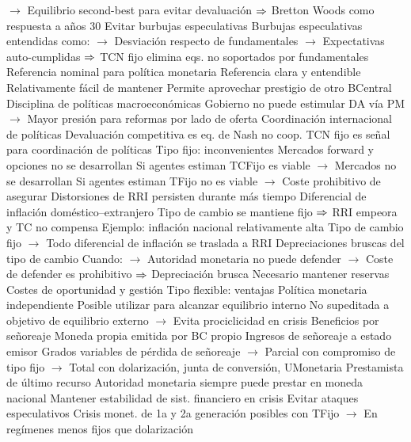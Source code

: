 \documentclass{nuevotema}
\begin{document}
\begin{esquemal}
				\4[] $\to$ Equilibrio second-best para evitar devaluación
				\4[] $\Rightarrow$ Bretton Woods como respuesta a años 30
				\4 Evitar burbujas especulativas
				\4[] Burbujas especulativas entendidas como:
				\4[] $\to$ Desviación respecto de fundamentales
				\4[] $\to$ Expectativas auto-cumplidas
				\4[] $\Rightarrow$ TCN fijo elimina eqs. no soportados por fundamentales
				\4 Referencia nominal para política monetaria
				\4[] Referencia clara y entendible
				\4[] Relativamente fácil de mantener
				\4[] Permite aprovechar prestigio de otro BCentral
				\4 Disciplina de políticas macroeconómicas
				\4[] Gobierno no puede estimular DA vía PM
				\4[] $\to$ Mayor presión para reformas por lado de oferta
				\4 Coordinación internacional de políticas
				\4[] Devaluación competitiva es eq. de Nash no coop.
				\4[] TCN fijo es señal para coordinación de políticas
			\3 Tipo fijo: inconvenientes
				\4 Mercados forward y opciones no se desarrollan
				\4[] Si agentes estiman TCFijo es viable
				\4[] $\to$ Mercados no se desarrollan
				\4[] Si agentes estiman TFijo no es viable
				\4[] $\to$ Coste prohibitivo de asegurar
				\4 Distorsiones de RRI persisten durante más tiempo
				\4[] Diferencial de inflación doméstico--extranjero
				\4[] Tipo de cambio se mantiene fijo
				\4[] $\Rightarrow$ RRI empeora y TC no compensa
				\4[] Ejemplo: inflación nacional relativamente alta
				\4[] Tipo de cambio fijo
				\4[] $\to$ Todo diferencial de inflación se traslada a RRI
				\4 Depreciaciones bruscas del tipo de cambio 
				\4[] Cuando:
				\4[] $\to$ Autoridad monetaria no puede defender
				\4[] $\to$ Coste de defender es prohibitivo
				\4[] $\Rightarrow$ Depreciación brusca
				\4 Necesario mantener reservas
				\4[] Costes de oportunidad y gestión
			\3 Tipo flexible: ventajas
				\4 Política monetaria independiente
				\4[] Posible utilizar para alcanzar equilibrio interno
				\4[] No supeditada a objetivo de equilibrio externo
				\4[] $\to$ Evita prociclicidad en crisis
				\4 Beneficios por señoreaje
				\4[] Moneda propia emitida por BC propio
				\4[] Ingresos de señoreaje a estado emisor
				\4[] Grados variables de pérdida de señoreaje
				\4[] $\to$ Parcial con compromiso de tipo fijo
				\4[] $\to$ Total con dolarización, junta de conversión, UMonetaria
				\4 Prestamista de último recurso
				\4[] Autoridad monetaria siempre puede prestar en moneda nacional
				\4[] Mantener estabilidad de sist. financiero en crisis
				\4 Evitar ataques especulativos
				\4[] Crisis monet. de 1a y 2a generación posibles con TFijo
				\4[] $\to$ En regímenes menos fijos que dolarización 

\end{esquemal}
\end{document}
